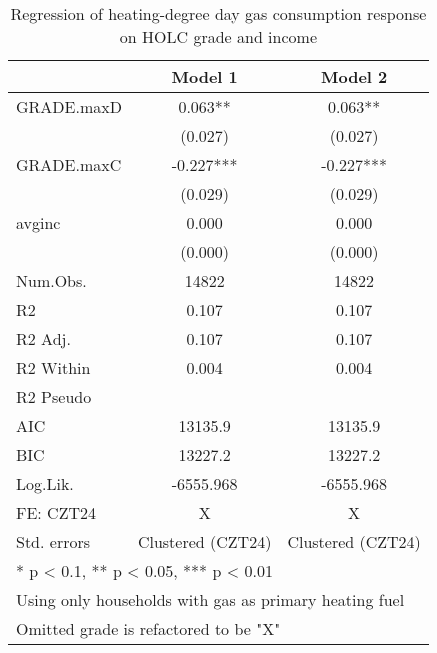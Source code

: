 \documentclass[
]{article}
\begin{document}
\begin{table}

\caption{\label{tab:RASS-1ex}Regression of heating-degree day gas consumption response on HOLC grade and income\label{tab:responsegas1}}
\centering
\begin{tabular}[t]{lcc}
\toprule
  & Model 1 & Model 2\\
\midrule
GRADE.maxD & 0.063** & 0.063**\\
 & (0.027) & (0.027)\\
GRADE.maxC & -0.227*** & -0.227***\\
 & (0.029) & (0.029)\\
avginc & 0.000 & 0.000\\
 & (0.000) & (0.000)\\
\midrule
Num.Obs. & 14822 & 14822\\
R2 & 0.107 & 0.107\\
R2 Adj. & 0.107 & 0.107\\
R2 Within & 0.004 & 0.004\\
R2 Pseudo &  & \\
AIC & 13135.9 & 13135.9\\
BIC & 13227.2 & 13227.2\\
Log.Lik. & -6555.968 & -6555.968\\
FE: CZT24 & X & X\\
Std. errors & Clustered (CZT24) & Clustered (CZT24)\\
\bottomrule
\multicolumn{3}{l}{\textsuperscript{} * p < 0.1, ** p < 0.05, *** p < 0.01}\\
\multicolumn{3}{l}{\textsuperscript{} Using only households with gas as primary heating fuel}\\
\multicolumn{3}{l}{\textsuperscript{} Omitted grade is refactored to be "X"}\\
\end{tabular}
\end{table}
\end{document}
